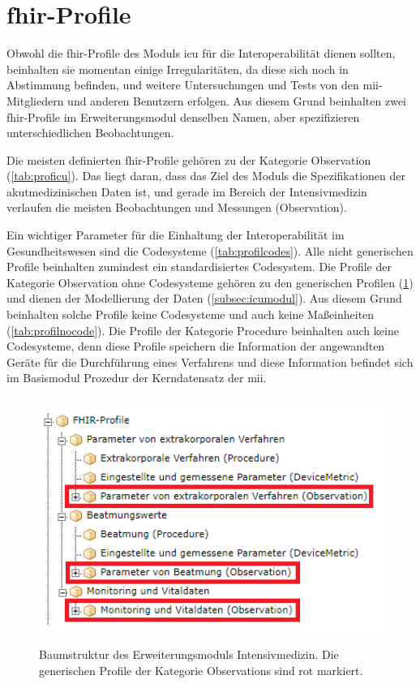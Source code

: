 \section{\acs{fhir}-Profile} \label{sec:fhiricudisc}

Obwohl die \ac{fhir}-Profile des Moduls \glqq\ac{icu}\grqq{} für die Interoperabilität dienen sollten, beinhalten sie momentan einige Irregularitäten, da diese sich noch in Abstimmung befinden, und weitere Untersuchungen und Tests von den \ac{mii}-Mitgliedern und anderen Benutzern erfolgen. Aus diesem Grund beinhalten zwei \ac{fhir}-Profile im Erweiterungsmodul denselben Namen, aber spezifizieren unterschiedlichen Beobachtungen.

Die meisten definierten \ac{fhir}-Profile gehören zu der Kategorie \glqq Observation\grqq{} (\ref{tab:proficu}). Das liegt daran, dass das Ziel des Moduls die Spezifikationen der akutmedizinischen Daten ist, und gerade im Bereich der Intensivmedizin verlaufen die meisten Beobachtungen und Messungen (\glqq Observation\grqq{}).

Ein wichtiger Parameter für die Einhaltung der Interoperabilität im Gesundheitswesen sind die Codesysteme (\ref{tab:profilcodes}). Alle nicht generischen Profile beinhalten zumindest ein standardisiertes Codesystem. Die Profile der Kategorie \glqq Observation\grqq{} ohne Codesysteme gehören zu den generischen Profilen (\ref{fig:icutreegenerics}) und dienen der Modellierung der Daten (\ref{subsec:icumodul}). Aus diesem Grund beinhalten solche Profile keine Codesysteme und auch keine Maßeinheiten (\ref{tab:profilnocode}). Die Profile der Kategorie \glqq Procedure\grqq{} beinhalten auch keine Codesysteme, denn diese Profile speichern die Information der angewandten Geräte für die Durchführung eines Verfahrens und diese Information befindet sich im Basismodul \glqq Prozedur\grqq{} der Kerndatensatz der \ac{mii}.

\begin{figure}[ht]
	\centering
	\includegraphics[height=8cm]{figures/icu_modul_tree_generics}
	\caption[Generische \glqq Observations\grqq{}]{Baumstruktur des Erweiterungsmoduls \glqq Intensivmedizin\grqq{}. Die generischen Profile der Kategorie \glqq Observations\grqq{} sind rot markiert.}
	\label{fig:icutreegenerics}
\end{figure}

